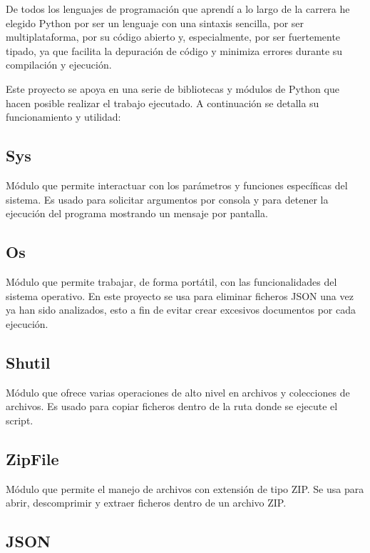 \documentclass[a4paper, 12pt]{book}
\begin{document}
De todos los lenguajes de programación que aprendí a lo largo de la carrera he elegido Python por ser un lenguaje con una sintaxis sencilla, por ser multiplataforma, por su código abierto y, especialmente, por ser fuertemente tipado, ya que facilita la depuración de código y minimiza errores durante su compilación y ejecución.

Este proyecto se apoya en una serie de bibliotecas y módulos de Python que hacen posible realizar el trabajo ejecutado. A continuación se detalla su funcionamiento y  utilidad:

\subsection{Sys}
\label{sec:sys}

Módulo que permite interactuar con los parámetros y funciones específicas del sistema. Es usado para solicitar argumentos por consola y para detener la ejecución del programa mostrando un mensaje por pantalla.

\subsection{Os}
\label{sec:os}

Módulo que permite trabajar, de forma portátil, con las funcionalidades del sistema operativo. En este proyecto se usa para eliminar ficheros JSON una vez ya han sido analizados, esto a fin de evitar crear excesivos documentos por cada ejecución.

\subsection{Shutil}
\label{sec:os}

Módulo que ofrece varias operaciones de alto nivel en archivos y colecciones de archivos. Es usado para copiar ficheros dentro de la ruta donde se ejecute el script.

\subsection{ZipFile}
\label{sec:zipfile}

Módulo que permite el manejo de archivos con extensión de tipo ZIP. Se usa para abrir, descomprimir y extraer ficheros dentro de un archivo ZIP.

\subsection{JSON}
\label{sec:jsonmodule}
\end{document}
